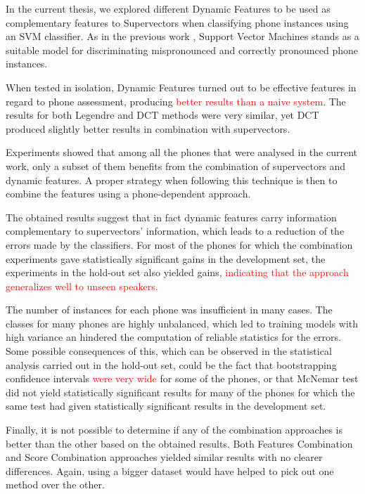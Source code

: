 In the current thesis, we explored different Dynamic Features to be used as complementary features to
Supervectors when classifying phone instances using an SVM classifier. As in the previous work \cite{main},
Support Vector Machines stands as a suitable model for discriminating mispronounced and correctly
pronounced phone instances.

When tested in isolation, Dynamic Features turned out to be effective features in regard to
phone assessment, producing \textcolor{red}{better results than a naive system}.
The results for both
Legendre and DCT methods were very similar, yet DCT produced slightly better results in combination with
supervectors.

Experiments showed that among all the phones that were analysed in the current work, only a subset of them
benefits from the combination of supervectors and dynamic features. A proper strategy when following this
technique is then to combine the features using a phone-dependent approach.

The obtained results suggest that in fact dynamic features carry
information complementary to supervectors' information, which leads to a reduction of the errors
made by the classifiers. For most of the phones for which the combination experiments gave statistically significant gains in the development set, the experiments in the hold-out set also yielded gains,
\textcolor{red}{
indicating that the approach generalizes well to unseen speakers.}

The number of instances for each phone was insufficient in many cases. The classes for many
phones are highly unbalanced, which led to training models with high variance an
hindered the computation of reliable statistics for the errors.
Some possible consequences
of this, which can be observed in the statistical analysis carried out in the hold-out set,
could be the fact that bootstrapping
confidence intervals \textcolor{red}{were very wide} for some of the phones,
or that McNemar test did not yield statistically significant results for many of the phones
for which the same test had given statistically significant results in the development set.

Finally, it is not possible to determine if any of the combination approaches is better than the other based
on the obtained results. Both Features Combination and Score Combination approaches yielded
similar results with no clearer differences. Again, using a bigger dataset would have helped to pick out one
method over the other.
